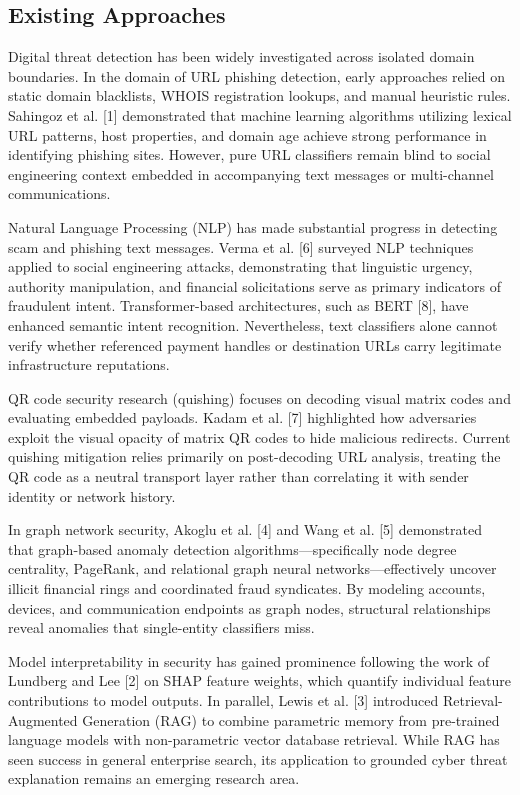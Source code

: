 \documentclass[conference,a4paper]{IEEEtran}
\begin{document}
\subsection{Existing Approaches}
Digital threat detection has been widely investigated across isolated domain boundaries. In the domain of URL phishing detection, early approaches relied on static domain blacklists, WHOIS registration lookups, and manual heuristic rules. Sahingoz et al. [1] demonstrated that machine learning algorithms utilizing lexical URL patterns, host properties, and domain age achieve strong performance in identifying phishing sites. However, pure URL classifiers remain blind to social engineering context embedded in accompanying text messages or multi-channel communications.

Natural Language Processing (NLP) has made substantial progress in detecting scam and phishing text messages. Verma et al. [6] surveyed NLP techniques applied to social engineering attacks, demonstrating that linguistic urgency, authority manipulation, and financial solicitations serve as primary indicators of fraudulent intent. Transformer-based architectures, such as BERT [8], have enhanced semantic intent recognition. Nevertheless, text classifiers alone cannot verify whether referenced payment handles or destination URLs carry legitimate infrastructure reputations.

QR code security research (quishing) focuses on decoding visual matrix codes and evaluating embedded payloads. Kadam et al. [7] highlighted how adversaries exploit the visual opacity of matrix QR codes to hide malicious redirects. Current quishing mitigation relies primarily on post-decoding URL analysis, treating the QR code as a neutral transport layer rather than correlating it with sender identity or network history.

In graph network security, Akoglu et al. [4] and Wang et al. [5] demonstrated that graph-based anomaly detection algorithms—specifically node degree centrality, PageRank, and relational graph neural networks—effectively uncover illicit financial rings and coordinated fraud syndicates. By modeling accounts, devices, and communication endpoints as graph nodes, structural relationships reveal anomalies that single-entity classifiers miss.

Model interpretability in security has gained prominence following the work of Lundberg and Lee [2] on SHAP feature weights, which quantify individual feature contributions to model outputs. In parallel, Lewis et al. [3] introduced Retrieval-Augmented Generation (RAG) to combine parametric memory from pre-trained language models with non-parametric vector database retrieval. While RAG has seen success in general enterprise search, its application to grounded cyber threat explanation remains an emerging research area.
\end{document}
